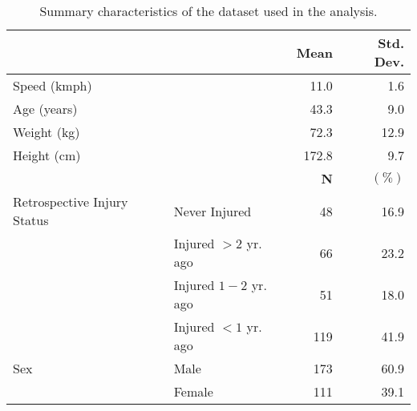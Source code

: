 \begin{table}
\centering
\begin{tabular}[t]{llrr}
\toprule
  &    & \textbf{Mean} & \textbf{Std. Dev.}\\
\midrule
Speed (kmph) &  & 11.0 & 1.6\\
Age (years) &  & 43.3 & 9.0\\
Weight (kg) &  & 72.3 & 12.9\\
Height (cm) &  & 172.8 & 9.7\\
\midrule
 &  & \textbf{N} & $\mathbf{\pmb{(\%)}}$\\
\midrule
Retrospective Injury Status & Never Injured & 48 & 16.9\\
 & Injured $>2$ yr. ago & 66 & 23.2\\
 & Injured $1-2$ yr. ago & 51 & 18.0\\
 & Injured $<1$ yr. ago & 119 & 41.9\\
Sex & Male & 173 & 60.9\\
 & Female & 111 & 39.1\\
\bottomrule
\end{tabular}
\caption{Summary characteristics of the dataset used in the analysis.}
\label{tab:tab1.}
\end{table}
